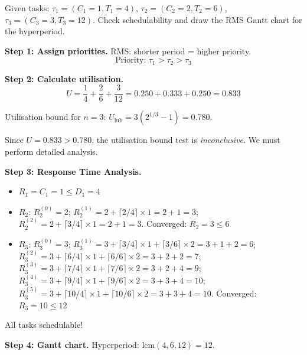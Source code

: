 \begin{example}
Given tasks: $\tau_1 = (C_1=1, T_1=4)$, $\tau_2 = (C_2=2, T_2=6)$, $\tau_3 = (C_3=3, T_3=12)$.
Check schedulability and draw the RMS Gantt chart for the hyperperiod.

\begin{solution}

\textbf{Step 1: Assign priorities.} RMS: shorter period = higher priority.
\[
\text{Priority: } \tau_1 > \tau_2 > \tau_3
\]

\textbf{Step 2: Calculate utilisation.}
\[
U = \frac{1}{4} + \frac{2}{6} + \frac{3}{12} = 0.250 + 0.333 + 0.250 = 0.833
\]

Utilisation bound for $n=3$: $U_{\mathrm{lub}} = 3(2^{1/3}-1) = 0.780$.

Since $U = 0.833 > 0.780$, the utilisation bound test is \emph{inconclusive}. We must perform detailed analysis.

\textbf{Step 3: Response Time Analysis.}
\begin{itemize}[nosep]
  \item $R_1 = C_1 = 1 \leq D_1 = 4$ \checkmark
  \item $R_2$: $R_2^{(0)} = 2$; $R_2^{(1)} = 2 + \lceil 2/4\rceil \times 1 = 2 + 1 = 3$; $R_2^{(2)} = 2 + \lceil 3/4\rceil \times 1 = 2 + 1 = 3$. Converged: $R_2 = 3 \leq 6$ \checkmark
  \item $R_3$: $R_3^{(0)} = 3$; $R_3^{(1)} = 3 + \lceil 3/4\rceil \times 1 + \lceil 3/6\rceil \times 2 = 3 + 1 + 2 = 6$; $R_3^{(2)} = 3 + \lceil 6/4\rceil \times 1 + \lceil 6/6\rceil \times 2 = 3 + 2 + 2 = 7$; $R_3^{(3)} = 3 + \lceil 7/4\rceil \times 1 + \lceil 7/6\rceil \times 2 = 3 + 2 + 4 = 9$; $R_3^{(4)} = 3 + \lceil 9/4\rceil \times 1 + \lceil 9/6\rceil \times 2 = 3 + 3 + 4 = 10$; $R_3^{(5)} = 3 + \lceil 10/4\rceil \times 1 + \lceil 10/6\rceil \times 2 = 3 + 3 + 4 = 10$. Converged: $R_3 = 10 \leq 12$ \checkmark
\end{itemize}

All tasks schedulable!

\textbf{Step 4: Gantt chart.} Hyperperiod: $\mathrm{lcm}(4, 6, 12) = 12$.

\begin{figure}[H]
\centering
{}
\end{figure}
\end{solution}
\end{example}
